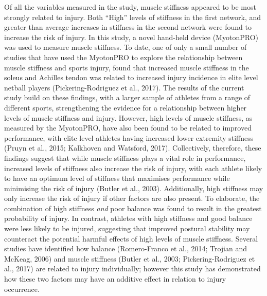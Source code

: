 \documentclass[
]{frontiersHLTH}
\begin{document}
Of all the variables measured in the study, muscle stiffness appeared to
be most strongly related to injury. Both ``High'' levels of stiffness in
the first network, and greater than average increases in stiffness in
the second network were found to increase the risk of injury. In this
study, a novel hand-held device (MyotonPRO) was used to measure muscle
stiffness. To date, one of only a small number of studies that have used
the MyotonPRO to explore the relationship between muscle stiffness and
sports injury, found that increased muscle stiffness in the soleus and
Achilles tendon was related to increased injury incidence in elite level
netball players (Pickering-Rodriguez et al., 2017). The results of the
current study build on these findings, with a larger sample of athletes
from a range of different sports, strengthening the evidence for a
relationship between higher levels of muscle stiffness and injury.
However, high levels of muscle stiffness, as measured by the MyotonPRO,
have also been found to be related to improved performance, with elite
level athletes having increased lower extremity stiffness (Pruyn et al.,
2015; Kalkhoven and Watsford, 2017). Collectively, therefore, these
findings suggest that while muscle stiffness plays a vital role in
performance, increased levels of stiffness also increase the risk of
injury, with each athlete likely to have an optimum level of stiffness
that maximises performance while minimising the risk of injury (Butler
et al., 2003). Additionally, high stiffness may only increase the risk
of injury if other factors are also present. To elaborate, the
combination of high stiffness \emph{and} poor balance was found to
result in the greatest probability of injury. In contrast, athletes with
high stiffness and good balance were less likely to be injured,
suggesting that improved postural stability may counteract the potential
harmful effects of high levels of muscle stiffness. Several studies have
identified how balance (Romero-Franco et al., 2014; Trojian and McKeag,
2006) and muscle stiffness (Butler et al., 2003; Pickering-Rodriguez et
al., 2017) are related to injury individually; however this study has
demonstrated how these two factors may have an additive effect in
relation to injury occurrence.
\end{document}
